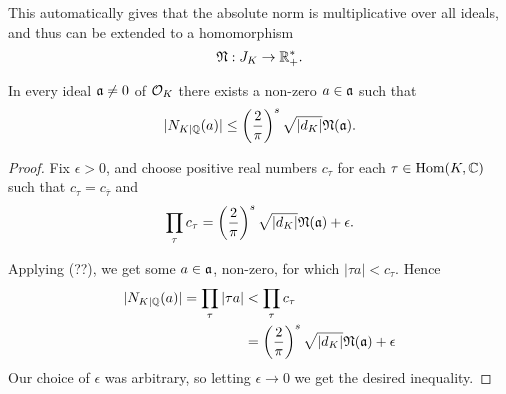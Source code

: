 This automatically gives that the absolute norm is multiplicative over all ideals, and thus can be extended to a homomorphism
\[
	\mathfrak{N} : J_K \to \mathbb{R}^*_+.
\]

\begin{lemma}
	In every ideal $\mathfrak{a}\neq 0$ of $\mathcal{O}_K$ there exists a non-zero $a\in\mathfrak{a}$ such that
	\[
		|N_{K\mid\mathbb{Q}}(a)| \leq \left(\frac{2}{\pi}\right)^s\sqrt{|d_K|}\mathfrak{N}(\mathfrak{a}).
	\]
\end{lemma}
\begin{proof}
	Fix $\epsilon>0$, and choose positive real numbers $c_\tau$ for each $\tau\in\text{Hom}(K,\mathbb{C})$ such that $c_\tau = c_{\overline{\tau}}$ and
	\[
		\prod_\tau c_\tau = \left(\frac{2}{\pi}\right)^s\sqrt{|d_K|}\mathfrak{N}(\mathfrak{a})+ \epsilon.
	\]

	Applying (??), we get some $a\in\mathfrak{a}$, non-zero, for which $|\tau a|<c_\tau$. Hence
	\begin{align*}
		|N_{K\mid\mathbb{Q}}(a)| = \prod_\tau |\tau a| &< \prod_\tau c_\tau\\
			&= \left(\frac{2}{\pi}\right)^s\sqrt{|d_K|}\mathfrak{N}(\mathfrak{a})+ \epsilon
	\end{align*}
	Our choice of $\epsilon$ was arbitrary, so letting $\epsilon\to 0$ we get the desired inequality.
\end{proof}

